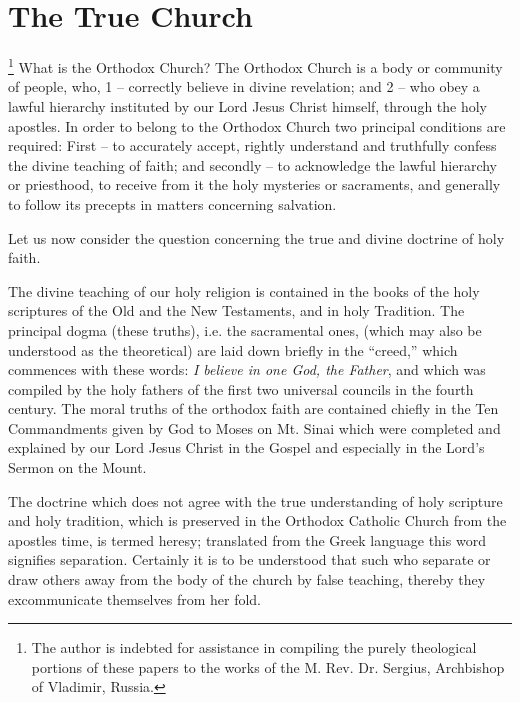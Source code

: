 \chapter{The True Church}

\footnote{The author is indebted for assistance in compiling the purely theological portions of these papers to the works of the M. Rev. Dr. Sergius, Archbishop of Vladimir, Russia.}
What is the Orthodox Church? The 
Orthodox Church is a body or community
of people, who, 1 -- correctly believe in divine revelation;
and 2 -- who obey a lawful hierarchy instituted by our Lord 
Jesus Christ himself, through the holy apostles.
In order to belong to the Orthodox Church two principal conditions
are required: First -- to accurately accept,
rightly understand and truthfully confess 
the divine teaching of faith; and secondly -- 
to acknowledge the lawful hierarchy or priesthood,
to receive from it the holy mysteries or 
sacraments, and generally to follow its precepts 
in matters concerning salvation. 

Let us now consider the question concerning 
the true and divine doctrine of holy faith. 

The divine teaching of our holy religion is 
contained in the books of the holy scriptures of 
the Old and the New Testaments, and in holy 
Tradition. The principal dogma (these truths), 
i.e. the sacramental ones, (which may also be understood
as the theoretical) are laid down briefly 
in the ``creed,'' which commences with these 
words: \textit{I believe in one God, the Father}, and 
which was compiled by the holy fathers of the 
first two universal councils in the fourth century.
The moral truths of the orthodox faith 
are contained chiefly in the Ten Commandments 
given by God to Moses on Mt. Sinai 
which were completed and explained by our 
Lord Jesus Christ in the Gospel and especially in 
the Lord's Sermon on the Mount. 

The doctrine which does not agree with the 
true understanding of holy scripture and holy 
tradition, which is preserved in the Orthodox
Catholic Church from the apostles time, is
termed heresy; translated from the Greek
language this word signifies separation. Certainly
it is to be understood that such who separate
or draw others away from the body of the 
church by false teaching, thereby they excommunicate
themselves from her fold. 

